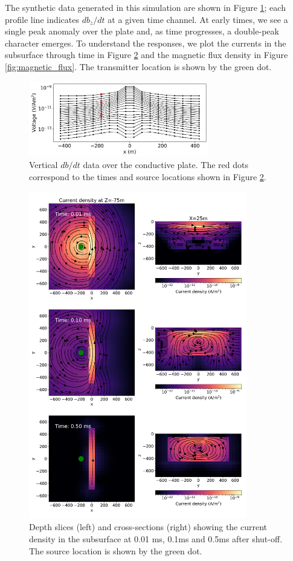 \documentclass[paper]{geophysics}
\begin{document}
The synthetic data generated in this simulation are shown in Figure \ref{fig:data}; each profile line indicates $db_z/dt$ at a given time channel. At early times, we see a single peak anomaly over the plate and, as time progresses, a double-peak character emerges. To understand the responses, we plot the currents in the subsurface through time in Figure \ref{fig:currents} and the magnetic flux density in Figure \ref{fig:magnetic_flux}. The transmitter location is shown by the green dot.

\begin{figure}[!htb]
  \centering
  \includegraphics[width=0.7\textwidth]{figures/data.png}
  \caption{Vertical $db/dt$ data over the conductive plate. The red dots correspond to the times and source locations shown in Figure \ref{fig:currents}.}
  \label{fig:data}
\end{figure}

\begin{figure}[!htb]
  \centering
  \includegraphics[width=0.85\textwidth]{figures/currents.png}
  \caption{Depth slices (left) and cross-sections (right) showing the current density in the subsurface at 0.01 ms, 0.1ms and 0.5ms after shut-off. The source location is shown by the green dot.}
  \label{fig:currents}
\end{figure}
\end{document}
